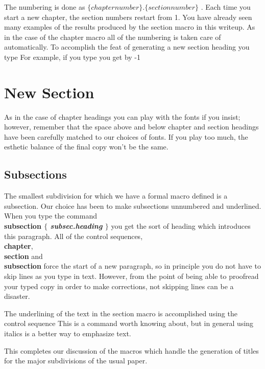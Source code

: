 \recallchap \recallsec
The numbering is done as $\{ chapter number\}.\{section number\}$ .
Each time you start a new chapter, the section numbers restart from
1.
You have already seen many examples of the results produced by
the section macro in this writeup.
As in the case of the chapter macro all of the numbering is taken
care of automatically.
To accomplish the feat of generating a new section heading you type
For example, if you type
you get
\advance\sectionnumber by -1 \section{ New Section }
As in the case of chapter headings you can play with the
fonts if you insist; however, remember that the space above and
below chapter and section headings have been carefully matched
to our choices of fonts.
If you play too much, the esthetic balance of the final copy
won't be the same.
 
\subsection{Subsections}
 
The smallest subdivision for which we have a formal macro
defined is a subsection.
Our choice has been to make subsections unnumbered and underlined.
When you type the command {\bf \\subsection
$\{$ {\it subsec.heading} $\}$ }
you get the sort of heading which introduces this paragraph.
All of the control sequences, {\bf \\chapter}, {\bf \\section} and
{\bf \\subsection} force the start of a new paragraph, so in principle
you do not have to skip lines as you type in text.
However, from the point of being able to proofread your
typed copy in order to make corrections, not skipping lines
can be a disaster.
 
The underlining of the text in the section macro is accomplished using
the control sequence
This is a command worth knowing about, but in general using italics
is a better way to emphasize text.
 
This completes our discussion of the macros which handle the
generation of titles for the major subdivisions of the usual paper.
 
